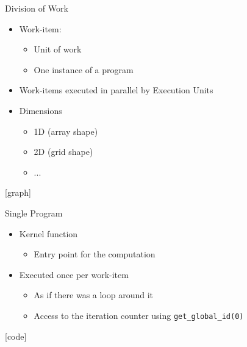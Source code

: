 \begin{frame}{Division of Work}

\begin{itemize}
    \item Work-item:
    \begin{itemize}
        \item Unit of work
        \item One instance of a program
    \end{itemize}
    \item Work-items executed in parallel by Execution Units
    \item Dimensions
    \begin{itemize}
        \item 1D (array shape)
        \item 2D (grid shape)
        \item ...
    \end{itemize}
\end{itemize}

[graph]

\end{frame}


\begin{frame}{Single Program}

\begin{itemize}
    \item Kernel function
    \begin{itemize}
        \item Entry point for the computation
    \end{itemize}
    \item Executed once per work-item
    \begin{itemize}
        \item As if there was a loop around it
        \item Access to the iteration counter using \texttt{get\_global\_id(0)}
    \end{itemize}
\end{itemize}

[code]

\end{frame}



